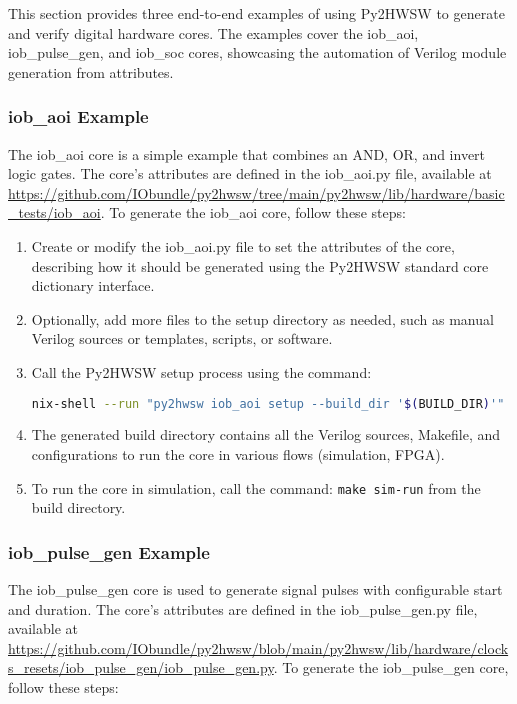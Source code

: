 %

This section provides three end-to-end examples of using Py2HWSW to generate and verify digital hardware cores. The examples cover the iob\_aoi, iob\_pulse\_gen, and iob\_soc cores, showcasing the automation of Verilog module generation from attributes.

\subsubsection{iob\_aoi Example}

The iob\_aoi core is a simple example that combines an AND, OR, and invert logic gates. The core's attributes are defined in the iob\_aoi.py file, available at \url{https://github.com/IObundle/py2hwsw/tree/main/py2hwsw/lib/hardware/basic_tests/iob_aoi}. To generate the iob\_aoi core, follow these steps:

\begin{enumerate}
\item Create or modify the iob\_aoi.py file to set the attributes of the core, describing how it should be generated using the Py2HWSW standard core dictionary interface.
\item Optionally, add more files to the setup directory as needed, such as manual Verilog sources or templates, scripts, or software.
\item Call the Py2HWSW setup process using the command:
\begin{lstlisting}[language=bash]
nix-shell --run "py2hwsw iob_aoi setup --build_dir '$(BUILD_DIR)'"
\end{lstlisting}
\item The generated build directory contains all the Verilog sources, Makefile, and configurations to run the core in various flows (simulation, FPGA).
\item To run the core in simulation, call the command: \texttt{make sim-run} from the build directory.
\end{enumerate}

\subsubsection{iob\_pulse\_gen Example}

The iob\_pulse\_gen core is used to generate signal pulses with configurable start and duration. The core's attributes are defined in the iob\_pulse\_gen.py file, available at \url{https://github.com/IObundle/py2hwsw/blob/main/py2hwsw/lib/hardware/clocks_resets/iob_pulse_gen/iob_pulse_gen.py}. To generate the iob\_pulse\_gen core, follow these steps:

